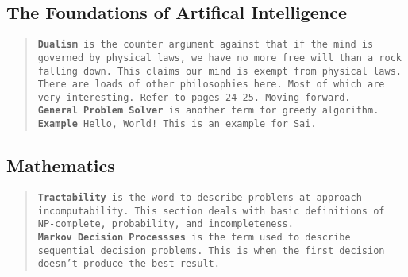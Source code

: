 \documentclass{article}
\begin{document}
\subsection{The Foundations of Artifical Intelligence}
\begin{quote}
    \texttt{\textbf{Dualism} is the counter argument against that if the mind is governed by physical laws, we have no more free will than a rock falling down. This claims our mind is exempt from physical laws.
        There are loads of other philosophies here. Most of which are very interesting. Refer to pages 24-25. Moving forward. \\
        \textbf{General Problem Solver} is another term for greedy algorithm. \textbf{Example} Hello, World! This is an example for Sai. }
\end{quote}
\subsection{Mathematics}
\begin{quote}
    \texttt{\textbf{Tractability} is the word to describe problems at approach incomputability. This section deals with basic definitions of NP-complete, probability, and incompleteness.
        \\ \textbf{Markov Decision Processses} is the term used to describe sequential decision problems. This is when the first decision doesn't produce the best result.}
\end{quote}
\end{document}
